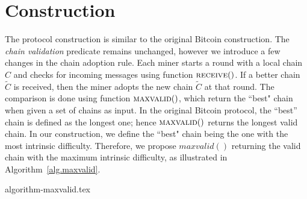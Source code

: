 \section{Construction}
The protocol construction is similar to the original Bitcoin construction.
The \emph{chain validation} predicate remains unchanged, however we introduce
a few changes in the chain adoption rule.
Each miner starts a round with a local chain $C$ and checks for incoming messages
using function $\textsc{receive}()$. If a better chain $\widetilde{C}$ is received, then the
miner adopts the new chain $\widetilde{C}$ at that round. The comparison is done using
function $\textsc{maxvalid}()$, which return the ``best" chain
when given a set of chains as input. In the original Bitcoin protocol, the
``best'' chain is defined as the longest one; hence $\textsc{maxvalid}()$ returns
the longest valid chain. In our construction, we define the ``best" chain being
the one with the most intrinsic difficulty.
Therefore, we propose $maxvalid()$ returning the valid chain
with the maximum intrinsic difficulty, as illustrated in Algorithm~\ref{alg.maxvalid}.

{algorithm-maxvalid.tex}
